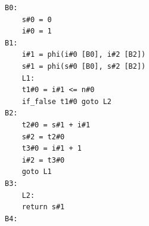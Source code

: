 \begin{lstlisting}[]
B0:
    s#0 = 0
    i#0 = 1
B1:
    i#1 = phi(i#0 [B0], i#2 [B2])
    s#1 = phi(s#0 [B0], s#2 [B2])
    L1:
    t1#0 = i#1 <= n#0
    if_false t1#0 goto L2
B2:
    t2#0 = s#1 + i#1
    s#2 = t2#0
    t3#0 = i#1 + 1
    i#2 = t3#0
    goto L1
B3:
    L2:
    return s#1
B4:
\end{lstlisting}
